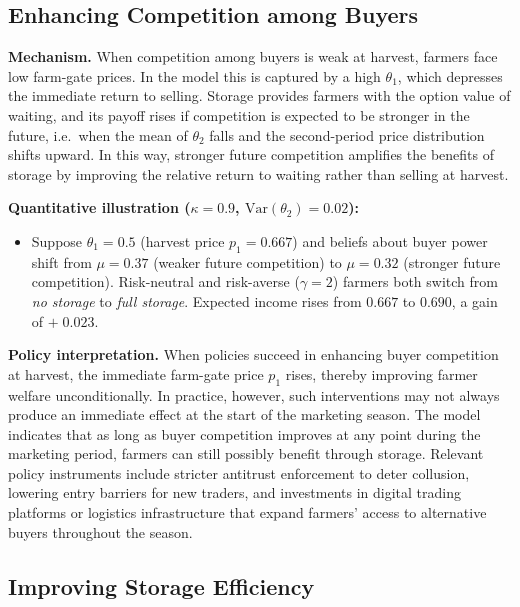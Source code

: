 \subsection{Enhancing Competition among Buyers}

\textbf{Mechanism.} When competition among buyers is weak at harvest, farmers face low farm-gate prices. In the model this is captured by a high $\theta_1$, which depresses the immediate return to selling. Storage provides farmers with the option value of waiting, and its payoff rises if competition is expected to be stronger in the future, i.e.\ when the mean of $\theta_2$ falls and the second-period price distribution shifts upward. In this way, stronger future competition amplifies the benefits of storage by improving the relative return to waiting rather than selling at harvest.

\textbf{Quantitative illustration ($\kappa=0.9$, $\text{Var}(\theta_2)=0.02$):}
\begin{itemize}
  \item Suppose $\theta_1=0.5$ (harvest price $p_1=0.667$) and beliefs about buyer power shift from $\mu=0.37$ (weaker future competition) to $\mu=0.32$ (stronger future competition). Risk-neutral and risk-averse ($\gamma=2$) farmers both switch from \emph{no storage} to \emph{full storage}. Expected income rises from $0.667$ to $0.690$, a gain of $+\;0.023$.
\end{itemize}

\textbf{Policy interpretation.} When policies succeed in enhancing buyer competition at harvest, the immediate farm-gate price $p_1$ rises, thereby improving farmer welfare unconditionally. In practice, however, such interventions may not always produce an immediate effect at the start of the marketing season. The model indicates that as long as buyer competition improves at any point during the marketing period, farmers can still possibly benefit through storage. Relevant policy instruments include stricter antitrust enforcement to deter collusion, lowering entry barriers for new traders, and investments in digital trading platforms or logistics infrastructure that expand farmers' access to alternative buyers throughout the season.






\subsection{Improving Storage Efficiency} \label{sec:storage-efficiency}

